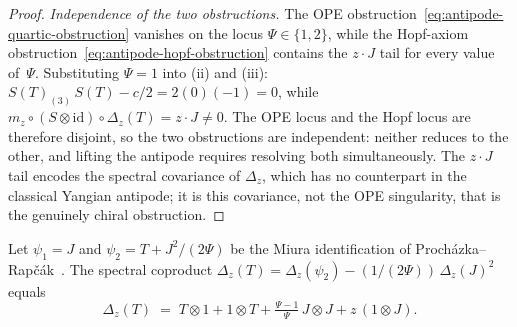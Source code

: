 \begin{proof}
\smallskip
\noindent\emph{Independence of the two obstructions.}
The OPE obstruction~\eqref{eq:antipode-quartic-obstruction}
vanishes on the locus $\Psi \in \{1, 2\}$, while the
Hopf-axiom obstruction~\eqref{eq:antipode-hopf-obstruction}
contains the $z \cdot J$ tail for every value of~$\Psi$.
Substituting $\Psi = 1$ into (ii) and (iii):
$S(T)_{(3)}\, S(T) - c/2 = 2(0)(-1) = 0$, while
$m_z \circ (S \otimes \mathrm{id}) \circ \Delta_z(T)
= z \cdot J \neq 0$.
The OPE locus and the Hopf locus are therefore disjoint, so the
two obstructions are independent: neither reduces to the other,
and lifting the antipode requires resolving both simultaneously.
The $z \cdot J$ tail encodes the spectral covariance of
$\Delta_z$, which has no counterpart in the classical Yangian
antipode; it is this covariance, not the OPE singularity, that is
the genuinely chiral obstruction.
\end{proof}

\begin{lemma}
\label{lem:coprod-T-miura}
\ClaimStatusProvedHere
Let $\psi_1 = J$ and $\psi_2 = T + J^2/(2\Psi)$ be the
Miura identification of
Proch\'azka--Rap\v{c}\'ak~\textup{\cite{PR19}}.
The spectral coproduct
$\Delta_z(T)
= \Delta_z(\psi_2) - (1/(2\Psi))\,\Delta_z(J)^2$
equals
\begin{equation}\label{eq:coprod-T-derived}
 \Delta_z(T)
 \;=\;
 T \otimes 1
 + 1 \otimes T
 + \tfrac{\Psi - 1}{\Psi}\,
 J \otimes J
 + z\,(1 \otimes J).
\end{equation}
\end{lemma}

